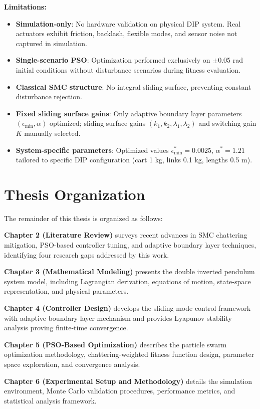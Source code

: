 \documentclass[12pt,a4paper,oneside]{report}
\newcommand{\emin}{\epsilon_{\min}}
\begin{document}
\textbf{Limitations:}
\begin{itemize}
\item \textbf{Simulation-only}: No hardware validation on physical DIP system. Real actuators exhibit friction, backlash, flexible modes, and sensor noise not captured in simulation.
\item \textbf{Single-scenario PSO}: Optimization performed exclusively on $\pm$0.05 rad initial conditions without disturbance scenarios during fitness evaluation.
\item \textbf{Classical SMC structure}: No integral sliding surface, preventing constant disturbance rejection.
\item \textbf{Fixed sliding surface gains}: Only adaptive boundary layer parameters $(\emin, \alpha)$ optimized; sliding surface gains $(k_1, k_2, \lambda_1, \lambda_2)$ and switching gain $K$ manually selected.
\item \textbf{System-specific parameters}: Optimized values $\emin^* = 0.0025$, $\alpha^* = 1.21$ tailored to specific DIP configuration (cart 1 kg, links 0.1 kg, lengths 0.5 m).
\end{itemize}

\section{Thesis Organization}

The remainder of this thesis is organized as follows:

\textbf{Chapter 2 (Literature Review)} surveys recent advances in SMC chattering mitigation, PSO-based controller tuning, and adaptive boundary layer techniques, identifying four research gaps addressed by this work.

\textbf{Chapter 3 (Mathematical Modeling)} presents the double inverted pendulum system model, including Lagrangian derivation, equations of motion, state-space representation, and physical parameters.

\textbf{Chapter 4 (Controller Design)} develops the sliding mode control framework with adaptive boundary layer mechanism and provides Lyapunov stability analysis proving finite-time convergence.

\textbf{Chapter 5 (PSO-Based Optimization)} describes the particle swarm optimization methodology, chattering-weighted fitness function design, parameter space exploration, and convergence analysis.

\textbf{Chapter 6 (Experimental Setup and Methodology)} details the simulation environment, Monte Carlo validation procedures, performance metrics, and statistical analysis framework.
\end{document}
